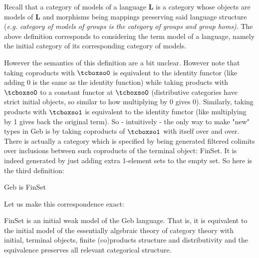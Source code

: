 Recall that a category of models of a language $\mathbf{L}$ is a category whose objects are models of $\mathbf{L}$ and morphisms being mappings preserving said language structure (\textit{e.g. category of models of groups is the category of groups and group homs)}. The above definition corresponds to considering the term model of a language, namely the initial category of its corresponding category of models.

However the semantics of this definition are a bit unclear. However note that taking coproducts with $\gebinit$ is equivalent to the identity functor (like adding 0 is the same as the identity function) while taking products with $\gebinit$ to a constant functor at $\gebinit$ (distributive categories have strict initial objects, so similar to how multiplying by 0 gives 0). Similarly, taking products with $\gebterm$ is equivalent to the identity functor (like multiplying by 1 gives back the original term). So - intuitively - the only way to make "new" types in Geb is by taking coproducts of $\gebterm$ with itself over and over. There is actually a category which is specified by being generated filtered colimits over inclusions between such coproducts of the terminal object: FinSet. It is indeed generated by just adding extra 1-element sets to the empty set. So here is the third definition:

\begin{definition}
Geb is FinSet
\end{definition}

Let us make this correspondence exact:

\begin{proposition}
FinSet is an initial weak model of the Geb language. That is, it is equivalent to the initial model of the essentially algebraic theory of category theory with initial, terminal objects, finite (co)products structure and distributivity and the equivalence preserves all relevant categorical structure.  
\end{proposition}

